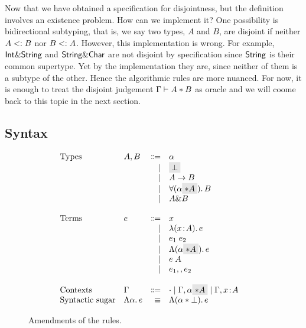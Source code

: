 Now that we have obtained a specification for disjointness, but the definition
involves an existence problem. How can we implement it? One possibility is
bidirectional subtyping, that is, we say two types, $A$ and $B$, are disjoint if
neither $A <: B$ nor $B <: A$. However, this implementation is
wrong. For example, $\textsf{Int} \& \textsf{String}$ and $\textsf{String} \& \textsf{Char}$ are
not disjoint by specification since $\textsf{String}$ is their common supertype. Yet
by the implementation they are, since neither of them is a subtype of
the other. 
Hence the algorithmic rules are more nuanced. For now, it is enough to treat the
disjoint judgement $\Gamma \vdash A * B$ as oracle and we will coome back to
this topic in the next section.


\subsection{Syntax}

\begin{figure}[h]
  \[
    \begin{array}{l}
      \begin{array}{llrll}
        \text{Types}
        & A, B & \Coloneqq & \alpha                  & \\
        &      & \mid & \highlight {$\bot$}          & \\
        &      & \mid & A \to B                      & \\
        &      & \mid & \for {(\alpha \highlight {$\disjoint A$})} B  & \\
        &      & \mid & A \inter B                   & \\

        \\
        \text{Terms}
        & e & \Coloneqq & x                        & \\
        &   & \mid & \lam {(x \oftype A)} e          & \\
        &   & \mid & \app {e_1} {e_2}              & \\
        &   & \mid & \blam {(\alpha \highlight {$\disjoint A$})} e  & \\
        &   & \mid & \tapp e A                     & \\
        &   & \mid & e_1 \mergeop e_2              & \\

        \\
        \text{Contexts}
        & \Gamma & \Coloneqq & \cdot
                   \mid \Gamma, \alpha \highlight {$\disjoint A$}
                   \mid \Gamma, x \oftype A  & \\

        \text{Syntactic sugar} & \blam \alpha e & \equiv & \blamdis \alpha \bot e & \\
      \end{array}
    \end{array}
  \]

  \label{fig:syntax}
  \caption{Amendments of the rules.}
\end{figure}


